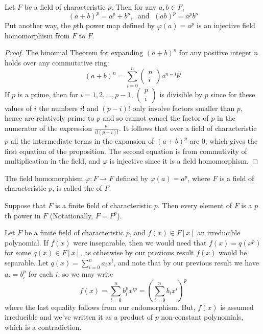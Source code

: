 \begin{proposition}
    Let $F$ be a field of characteristic $p$. Then for any $a,b \in F$, \begin{equation*}
        (a+b)^p = a^p+b^p,\; \text{ and }\; (ab)^p = a^pb^p
    \end{equation*}
    Put another way, the $p$th power map defined by $\varphi(a) = a^p$ is an injective field homomorphism from $F$ to $F$.
\end{proposition}
\begin{proof}
    The binomial Theorem for expanding $(a+b)^n$ for any positive integer $n$ holds over any commutative ring: \begin{equation*}
        (a+b)^n=\sum_{i=0}^n\begin{pmatrix} n \\ i\end{pmatrix}a^{n-i}b^i
    \end{equation*}
    If $p$ is a prime, then for $i = 1,2,...,p-1$, $\begin{pmatrix} p \\ i\end{pmatrix}$ is divisible by $p$ since for these values of $i$ the numbers $i!$ and $(p-i)!$ only involve factors smaller than $p$, hence are relatively prime to $p$ and so cannot cancel the factor of $p$ in the numerator of the expression $\frac{p!}{i!(p-i)!}$. It follows that over a field of characteristic $p$ all the intermediate terms in the expansion of $(a+b)^p$ are $0$, which gives the first equation of the proposition. The second equation is from commutivity of multiplication in the field, and $\varphi$ is injective since it is a field homomorphism.
\end{proof}


\begin{definition}
    The field homomorphism $\varphi:F\rightarrow F$ defined by $\varphi(a) = a^p$, where $F$ is a field of characteristic $p$, is called the  of $F$.
\end{definition}

\begin{corollary}
    Suppose that $F$ is a finite field of characteristic $p$. Then every element of $F$ is a $p$th power in $F$ (Notationally, $F = F^p$).
\end{corollary}


Let $F$ be a finite field of characteristic $p$, and $f(x) \in F[x]$ an irreducible polynomial. If $f(x)$ were inseparable, then we would need that $f(x) = q(x^p)$ for some $q(x) \in F[x]$, as otherwise by our previous result $f(x)$ would be separable. Let $q(x) = \sum_{i=0}^na_ix^i$, and note that by our previous result we have $a_i = b_i^p$ for each $i$, so we may write \begin{equation*}
    f(x) = \sum_{i=0}^nb_i^px^{ip} = \left(\sum_{i=0}^nb_ix^i\right)^p
\end{equation*}
where the last equality follows from our endomorphism. But, $f(x)$ is assumed irreducible and we've written it as a product of $p$ non-constant polynomials, which is a contradiction. 

